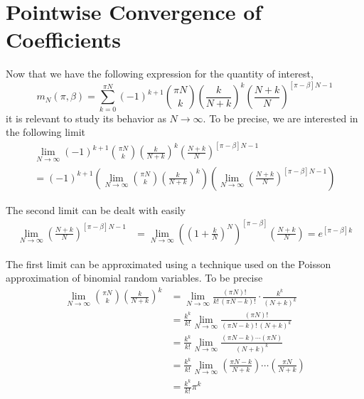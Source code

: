 \documentclass{article}
\newcommand{\ppar}[1]{\left( #1 \right)}
\newcommand{\spar}[1]{\left[ #1 \right]}
\begin{document}
\section{Pointwise Convergence of Coefficients}
\label{ap:coeff}

Now that we have the following expression for the quantity of interest,
\begin{equation}
    m_N(\pi, \beta) =
    \sum_{k=0}^{\pi N}
    (-1)^{k+1} 
    \binom{\pi N}{k}
    \ppar{\frac{k}{N+k}}^k
    \ppar{\frac{N+k}{N}}^{\spar{\pi-\beta} N -1}
\end{equation}
it is relevant to study its behavior as $N\rightarrow \infty$. 
%
To be precise, we are interested in the following limit
\begin{multline}
    \lim_{N \rightarrow \infty}
    (-1)^{k+1} 
    \binom{\pi N}{k}
    \ppar{\frac{k}{N+k}}^k
    \ppar{\frac{N+k}{N}}^{\spar{\pi-\beta} N -1}
    \\
    =
    (-1)^{k+1}
    \ppar{\lim_{N \rightarrow \infty}
    \binom{\pi N}{k}
    \ppar{\frac{k}{N+k}}^k}
    \ppar{\lim_{N \rightarrow \infty}
    \ppar{\frac{N+k}{N}}^{\spar{\pi-\beta} N -1}}
\end{multline}

The second limit can be dealt with easily
\begin{align*}
    \lim_{N \rightarrow \infty}
    \ppar{\frac{N+k}{N}}^{\spar{\pi-\beta} N -1}
    &=
    \lim_{N \rightarrow \infty}
    \ppar{\ppar{1+\frac{k}{N}}^N}^{\spar{\pi - \beta}}
    \ppar{\frac{N+k}{N}}
    =
    e^{\spar{\pi - \beta}k}
\end{align*}

The first limit can be approximated using a technique used on the Poisson approximation of binomial random variables. 
%
To be precise
\begin{align*}
    \lim_{N \rightarrow \infty}
    \binom{\pi N}{k}
    \ppar{\frac{k}{N+k}}^k
    &=
    \lim_{N \rightarrow \infty}
    \frac{\ppar{\pi N}!}{k!\, \ppar{\pi N-k}!} \cdot 
    \frac{k^k}{\ppar{N+k}^k}
    \\
    &=
    \frac{k^k}{k!}
    \lim_{N \rightarrow \infty}
    \frac{\ppar{\pi N}!}{\ppar{\pi N-k}!\, \ppar{N+k}^k}
    \\
    &=
    \frac{k^k}{k!}
    \lim_{N \rightarrow \infty}
    \frac{\ppar{\pi N-k} \cdots \ppar{\pi N} }{\ppar{N+k}^k}
    \\
    &=
    \frac{k^k}{k!}
    \lim_{N \rightarrow \infty}
    \ppar{\frac{\pi N-k}{N+k}} \cdots \ppar{\frac{\pi N}{N+k}}
    \\
    &=
    \frac{k^k}{k!}
    \pi ^k
\end{align*}
\end{document}
